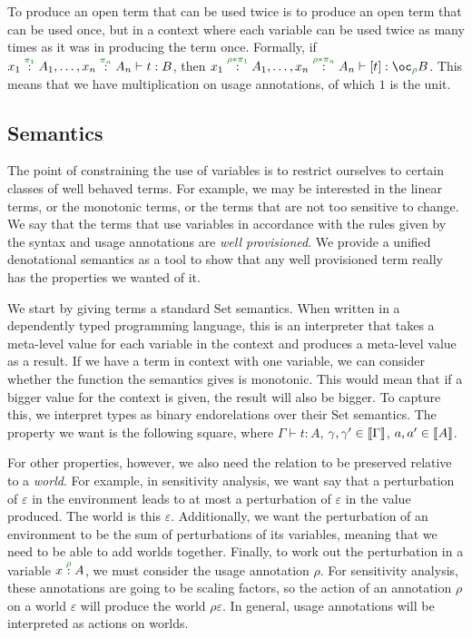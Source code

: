 To produce an open term that can be used twice is to produce an open term that
can be used once, but in a context where each variable can be used twice as many
times as it was in producing the term once.
Formally, if
$\ctxvar{x_1}{A_1}{\pi_1}, \ldots, \ctxvar{x_n}{A_n}{\pi_n} \vdash t : B$, then
$\ctxvar{x_1}{A_1}{\rho*\pi_1}, \ldots, \ctxvar{x_n}{A_n}{\rho*\pi_n} \vdash
\bang t : \excl{\rho}{B}$.
This means that we have multiplication on usage annotations, of which $1$ is the
unit.

\subsection{Semantics}

The point of constraining the use of variables is to restrict ourselves to
certain classes of well behaved terms.
For example, we may be interested in the linear terms, or the monotonic terms,
or the terms that are not too sensitive to change.
We say that the terms that use variables in accordance with the rules given by
the syntax and usage annotations are \emph{well provisioned}.
We provide a unified denotational semantics as a tool to show that any well
provisioned term really has the properties we wanted of it.

We start by giving terms a standard $\mathrm{Set}$ semantics.
When written in a dependently typed programming language, this is an interpreter
that takes a meta-level value for each variable in the context and produces a
meta-level value as a result.
If we have a term in context with one variable, we can consider whether the
function the semantics gives is monotonic.
This would mean that if a bigger value for the context is given, the result will
also be bigger.
To capture this, we interpret types as binary endorelations over their
$\mathrm{Set}$ semantics.
The property we want is the following square, where $\Gamma \vdash t : A$,
$\gamma, \gamma' \in \left\llbracket \Gamma \right\rrbracket$, $a, a' \in \left\llbracket A \right\rrbracket$.


For other properties, however, we also need the relation to be preserved
relative to a \emph{world}.
For example, in sensitivity analysis, we want say that a perturbation of
$\varepsilon$ in the environment leads to at most a perturbation of
$\varepsilon$ in the value produced.
The world is this $\varepsilon$.
Additionally, we want the perturbation of an environment to be the sum of
perturbations of its variables, meaning that we need to be able to add worlds
together.
Finally, to work out the perturbation in a variable $\ctxvar{x}{A}{\rho}$, we
must consider the usage annotation $\rho$.
For sensitivity analysis, these annotations are going to be scaling factors, so
the action of an annotation $\rho$ on a world $\varepsilon$ will produce the
world $\rho\varepsilon$.
In general, usage annotations will be interpreted as actions on worlds.
